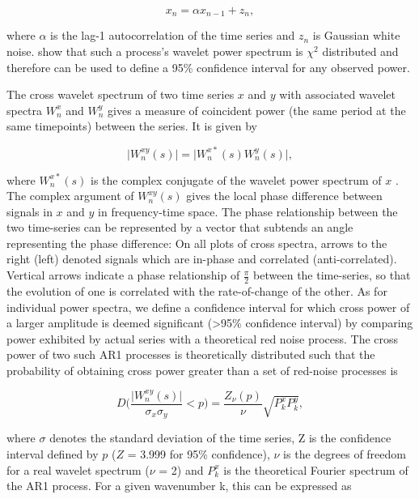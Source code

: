 \begin{equation} \label{rednoise}
x_n = \alpha x_{n - 1} + z_n,
\end{equation}

where $\alpha$ is the lag-1 autocorrelation of the time series and $z_n$ is Gaussian white noise. \cite{Torrence1998} show that such a process's wavelet power spectrum is $\chi^2$ distributed and therefore can be used to define a 95\% confidence interval for any observed power. 

The cross wavelet spectrum of two time series $x$ and $y$ with associated wavelet spectra $W^x_n$ and $W^y_n$ gives a measure of coincident power (the same period at the same timepoints) between the series. It is given by

\begin{equation} \label{wavelet_cross}
\vert W^{xy}_n(s)\vert = \vert W^{x*}_n(s) W^{y}_n(s)\vert,
\end{equation}

where $W^{x*}_n(s)$ is the complex conjugate of the wavelet power spectrum of $x$ \citep{Grinstead2004}. The complex argument of $W^{xy}_n(s)$ gives the local phase difference between signals in $x$ and $y$ in frequency-time space. The phase relationship between the two time-series can be represented by a
vector that subtends an angle representing the phase difference: On all plots of cross spectra, arrows to the right (left) denoted signals which are in-phase and correlated (anti-correlated). Vertical arrows indicate a phase relationship of $\frac{\pi}{2}$ between the time-series, so that the evolution of
one is correlated with the rate-of-change of the other. As for individual power spectra, we define a confidence interval for which cross power of a larger amplitude is deemed significant (>95\% confidence interval) by comparing power exhibited by actual series with a theoretical red noise process. The cross power of two such AR1 processes is theoretically distributed such that the probability of obtaining cross power greater than a set of red-noise processes is

\begin{equation} \label{wavelet_cross_dist}
D\bigg(\frac{\vert W^{xy}_n(s)\vert}{\sigma_x \sigma_y} < p\bigg) = \frac{Z_\nu(p)}{\nu} \sqrt{P^x_k P^y_k},
\end{equation}

where $\sigma$ denotes the standard deviation of the time series, Z is the confidence interval defined by $p$ ($Z$ = 3.999 for 95\% confidence), $\nu$ is the degrees of freedom for a real wavelet spectrum ($\nu$ = 2) and $P^x_k$ is the theoretical Fourier spectrum of the AR1 process. For a given wavenumber k, this can be expressed as

